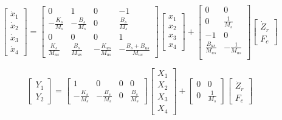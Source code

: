\begin{equation}
\begin{bmatrix}
	\dot{x}_1 \\
	\dot{x}_2 \\
	\dot{x}_3 \\
	\dot{x}_4
\end{bmatrix} = 
\begin{bmatrix}
	0 & 1 & 0 & -1 \\
	-\frac{K_s}{M_s} & -\frac{B_s}{M_s} & 0 & \frac{B_s}{M_s} \\
	0 & 0 & 0 & 1 \\
	\frac{K_s}{M_{us}} & \frac{B_s}{M_{us}} & -\frac{K_{us}}{M_{us}} & -\frac{B_s + B_{us}}{M_{us}} 
\end{bmatrix}
\begin{bmatrix}
	x_1 \\
	x_2 \\
	x_3 \\
	x_4
\end{bmatrix} + 
\begin{bmatrix}
	0 & 0 \\
	0 & \frac{1}{M_{s}} \\
	-1 & 0 \\
	\frac{B_{us}}{M_{us}} & -\frac{1}{M_{us}} \\
\end{bmatrix}
\begin{bmatrix}
	\dot{Z}_r \\
	F_c
\end{bmatrix}
\end{equation}


\begin{equation}
\begin{bmatrix}
	Y_1 \\
	Y_2
\end{bmatrix} = 
\begin{bmatrix}
	1 & 0 & 0 & 0 \\
	-\frac{K_s}{M_s} & -\frac{B_s}{M_s} & 0 & \frac{B_s}{M_s} 
\end{bmatrix}
\begin{bmatrix}
	X_1 \\
	X_2 \\
	X_3 \\
	X_4
\end{bmatrix} + 
\begin{bmatrix}
	0 & 0 \\
	0 & \frac{1}{M_s}
\end{bmatrix}
\begin{bmatrix}
	\dot{Z}_r \\
	F_c
\end{bmatrix}
\end{equation}







